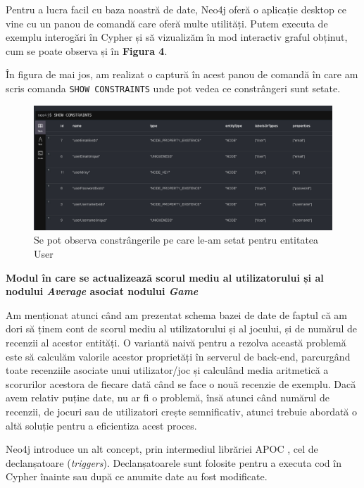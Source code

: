 \documentclass[12pt,a4paper]{report}
\begin{document}
Pentru a lucra facil cu baza noastră de date, Neo4j oferă o aplicație desktop ce vine cu un panou de comandă care oferă multe utilități. Putem executa de exemplu interogări în Cypher și să vizualizăm în mod interactiv graful obținut, cum se poate observa și în \textbf{Figura 4}.

În figura de mai jos, am realizat o captură în acest panou de comandă în care am scris comanda \texttt{SHOW CONSTRAINTS} unde pot vedea ce constrângeri sunt setate.

\begin{figure}[H]
\centering
\caption{}
\begin{adjustbox}{max size={\textwidth}{\textheight}}
\includegraphics[scale = 0.5]{exemplu_9_neo4j}
\end{adjustbox}
\caption*{Se pot observa constrângerile pe care le-am setat pentru entitatea User}
\end{figure}

\bigskip
\textbf{Modul în care se actualizează scorul mediu al utilizatorului și al nodului \emph{Average} asociat nodului \emph{Game}}
\bigskip

Am menționat atunci când am prezentat schema bazei de date de faptul că am dori să ținem cont de scorul mediu al utilizatorului și al jocului, și de numărul de recenzii al acestor entități. O variantă naivă pentru a rezolva această problemă este să calculăm valorile acestor proprietăți în serverul de back-end, parcurgând toate recenziile asociate unui utilizator/joc și calculând media aritmetică a scorurilor acestora de fiecare dată când se face o nouă recenzie de exemplu. Dacă avem relativ puține date, nu ar fi o problemă, însă atunci când numărul de recenzii, de jocuri sau de utilizatori crește semnificativ, atunci trebuie abordată o altă soluție pentru a eficientiza acest proces.

Neo4j introduce un alt concept, prin intermediul librăriei APOC \cite{13}, cel de declanșatoare
(\emph{triggers}). \cite{14}
Declanșatoarele sunt folosite pentru a executa cod în Cypher înainte sau după ce anumite date au fost modificate.
\end{document}
